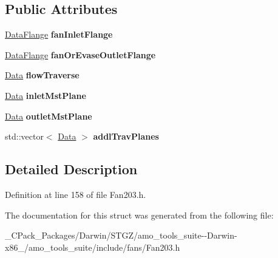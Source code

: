 \subsection*{Public Attributes}
\begin{DoxyCompactItemize}
\item 
\mbox{\label{struct_plane_data_1_1_node_binding_1_1_output_a1e03cb2e19c2b0284f75df5cdf065675}} 
\hyperlink{struct_plane_data_1_1_node_binding_1_1_data_flange}{Data\+Flange} {\bfseries fan\+Inlet\+Flange}
\item 
\mbox{\label{struct_plane_data_1_1_node_binding_1_1_output_af07f4acd58bb66b2c9c1b887427d2fbb}} 
\hyperlink{struct_plane_data_1_1_node_binding_1_1_data_flange}{Data\+Flange} {\bfseries fan\+Or\+Evase\+Outlet\+Flange}
\item 
\mbox{\label{struct_plane_data_1_1_node_binding_1_1_output_a5dfaab5fc6ebed9f699191eb3903a97e}} 
\hyperlink{struct_plane_data_1_1_node_binding_1_1_data}{Data} {\bfseries flow\+Traverse}
\item 
\mbox{\label{struct_plane_data_1_1_node_binding_1_1_output_afdb50efd9bba21241d822a10cc8b804c}} 
\hyperlink{struct_plane_data_1_1_node_binding_1_1_data}{Data} {\bfseries inlet\+Mst\+Plane}
\item 
\mbox{\label{struct_plane_data_1_1_node_binding_1_1_output_a7ca28948b57ea956833151a20f446ea1}} 
\hyperlink{struct_plane_data_1_1_node_binding_1_1_data}{Data} {\bfseries outlet\+Mst\+Plane}
\item 
\mbox{\label{struct_plane_data_1_1_node_binding_1_1_output_aee139722930a59d1be944bd1f56365a3}} 
std\+::vector$<$ \hyperlink{struct_plane_data_1_1_node_binding_1_1_data}{Data} $>$ {\bfseries addl\+Trav\+Planes}
\end{DoxyCompactItemize}


\subsection{Detailed Description}


Definition at line 158 of file Fan203.\+h.



The documentation for this struct was generated from the following file\+:\begin{DoxyCompactItemize}
\item 
\+\_\+\+C\+Pack\+\_\+\+Packages/\+Darwin/\+S\+T\+G\+Z/amo\+\_\+tools\+\_\+suite-\/-\/\+Darwin-\/x86\+\_/amo\+\_\+tools\+\_\+suite/include/fans/Fan203.\+h\end{DoxyCompactItemize}
